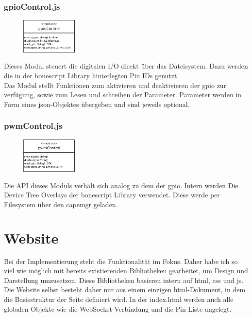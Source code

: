\subsubsection{gpioControl.js}
\begin{figure}
  \vspace{-16pt}
  \centering
  \includegraphics[width = 0.25\textwidth]{documentation/images/apiGPIOControl.eps}
\end{figure}

Dieses Modul steuert die digitalen I/O direkt über das Dateisystem. Dazu werden die in der bonescript Library hinterlegten Pin IDs genutzt.\\

Das Modul stellt Funktionen zum aktivieren und deaktivieren der \gls{gpio} zur verfügung, sowie zum Lesen und schreiben der Parameter. Parameter werden in Form eines \gls{json}-Objektes übergeben und sind jeweils optional.

\subsubsection{pwmControl.js}
\begin{figure}
  \vspace{-16pt}
  \centering
  \includegraphics[width = 0.25\textwidth]{documentation/images/apiPWMControl.eps}
\end{figure}

Die API dieses Moduls verhält sich analog zu dem der \gls{gpio}. Intern werden Die Device Tree Overlays der bonescript Library verwendet. Diese werde per Filesystem über den \gls{capemgr} geladen.

\section{Website} Bei der Implementierung steht die Funktionalität im Fokus. Daher habe ich so viel wie möglich mit bereits existierenden Bibliotheken gearbeitet, um Design und Darstellung umzusetzen. Diese Bibliotheken basieren intern auf \gls{html}, \gls{css} und \gls{js}.\\
Die Website selbst besteht daher nur aus einem einzigen \gls{html}-Dokument, in dem die Basisstruktur der Seite definiert wird. In der index.html werden auch alle globalen Objekte wie die WebSocket-Verbindung und die Pin-Liste angelegt.\\

